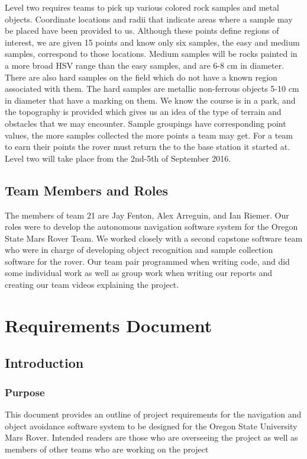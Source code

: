 \documentclass[10pt, oneside,onecolumn]{IEEEtran}
\begin{document}
\begin{titlepage}
Level two requires teams to pick up various colored rock samples and metal objects. Coordinate locations and radii that indicate areas where a sample may be placed have been provided to us. Although these points define regions of interest, we are given 15 points and know only six samples, the easy and medium samples, correspond to those locations. Medium samples will be rocks painted in a more broad HSV range than the easy samples, and are 6-8 cm in diameter. There are also hard samples on the field which do not have a known region associated with them. The hard samples are metallic non-ferrous objects 5-10 cm in diameter that have a marking on them. We know the course is in a park, and the topography is provided which gives us an idea of the type of terrain and obstacles that we may encounter. Sample groupings have corresponding point values, the more samples collected the more points a team may get. For a team to earn their points the rover must return the to the base station it started at. Level two will take place from the 2nd-5th of September 2016.

\subsection{Team Members and Roles}
The members of team 21 are Jay Fenton, Alex Arreguin, and Ian Riemer. Our roles were to develop the autonomous navigation software system for the Oregon State Mars Rover Team. We worked closely with a second capstone software team who were in charge of developing object recognition and sample collection software for the rover. Our team pair programmed when writing code, and did some individual work as well as group work when writing our reports and creating our team videos explaining the project. 

\section{Requirements Document}

\subsection{Introduction}

\subsubsection{Purpose}
This document provides an outline of project requirements for the navigation and object avoidance software system to be designed for the Oregon State University Mars Rover. Intended readers are those who are overseeing the project as well as members of other teams who are working on the project 


\end{titlepage}
\end{document}
